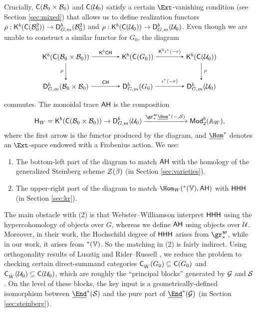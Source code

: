 \documentclass[a4paper,10pt,leqno]{amsart}
\theoremstyle{plain}
\theoremstyle{plain}
\theoremstyle{plain}
\theoremstyle{definition}
\theoremstyle{remark}
\let\Alt\relax
\DeclareMathOperator{\Alt}{\text{$\Lambda$}}
\newcommand{\Mod}{\mathsf{Mod}}
\begin{document}
Crucially, $\sf{C}(\cal{B}_0 \times \cal{B}_0)$ and $\sf{C}(\cal{U}_0)$ satisfy a certain $\Ext$-vanishing condition (see Section \ref{sec:mixed}) that allows us to define realization functors $\rho : \sf{K}^b(\sf{C}(\cal{B}_0^2)) \to \sf{D}_{G, m}^b(\cal{B}_0^2)$ and $\rho : \sf{K}^b(\sf{C}(\cal{U}_0)) \to \sf{D}_{G, m}^b(\cal{U}_0)$.
Even though we are unable to construct a similar functor for $G_0$, the diagram
\begin{equation}
\begin{tikzpicture}[baseline=(current bounding box.center), >=stealth]
\matrix(m)[matrix of math nodes, row sep=2.5em, column sep=4em, text height=2ex, text depth=0.5ex]
{	\sf{K}^b(\sf{C}(\cal{B}_0 \times \cal{B}_0))
		&\sf{K}^b(\sf{C}(G_0))
		&\sf{K}^b(\sf{C}(\cal{U}_0))\\
	\sf{D}_{G, m}^b(\cal{B}_0 \times \cal{B}_0)
		&\sf{D}_{G, m}^b(G_0)
		&\sf{D}_{G, m}^b(\cal{U}_0)\\
		};
\path[->,font=\scriptsize, auto]
(m-1-2) 	edge node{$\sf{K}^b i^\ast \langle -r\rangle$} (m-1-3)
(m-2-2)		edge node{$i^\ast \langle -r\rangle$} (m-2-3)
(m-1-1)		edge node{$\sf{K}^b \sf{CH}$} (m-1-2)
(m-2-1)		edge node{$\sf{CH}$} (m-2-2)
(m-1-3) 	edge node[right]{$\rho$} (m-2-3)	
(m-1-1)		edge node[left]{$\rho$} (m-2-1);
\end{tikzpicture}
\end{equation}
commutes.
The monoidal trace $\sf{AH}$ is the composition
\begin{align}
\sf{H}_W = \sf{K}^b(\sf{C}(\cal{B}_0 \times \cal{B}_0))
	\to \sf{D}_{G, m}^b(\cal{U}_0)
	\xrightarrow{\gr_\ast^{\bm{w}} \SHom^\ast(-, \cal{S})} \Mod_2^b(\bb{A}_W),
\end{align}
where the first arrow is the functor produced by the diagram, and $\SHom^\ast$ denotes an $\Ext$-space endowed with a Frobenius action.
We use:
\begin{enumerate}
\item 	The bottom-left part of the diagram to match $\sf{AH}$ with the homology of the generalized Steinberg scheme $\cal{Z}(\beta)$ (in Section \ref{sec:varieties}).
\item 	The upper-right part of the diagram to match $\Hom_W(\Alt^\ast(\bb{V}), \sf{AH})$ with $\sf{HHH}$ (in Section \ref{sec:kr}).
\end{enumerate}
The main obstacle with (2) is that Webster--Williamson interpret $\sf{HHH}$ using the hypercohomology of objects over $G$, whereas we define $\sf{AH}$ using objects over $\cal{U}$.
Moreover, in their work, the Hochschild degree of $\sf{HHH}$ arises from $\gr_\ast^{\bm{w}}$, while in our work, it arises from $\Alt^\ast(\bb{V})$.
So the matching in (2) is fairly indirect.
Using orthogonality results of Lusztig \cite{lusztig_1985_2} and Rider--Russell \cite{rr}, we reduce the problem to checking certain direct-summand categories $\sf{C}_{\hat{W}}(G_0) \subseteq \sf{C}(G_0)$ and $\sf{C}_{\hat{W}}(\cal{U}_0) \subseteq \sf{C}(\cal{U}_0)$, which are roughly the ``principal blocks'' generated by $\cal{G}$ and $\cal{S}$.
On the level of these blocks, the key input is a geometrically-defined isomorphism between $\SEnd^\ast(\cal{S})$ and the pure part of $\SEnd^\ast(\cal{G})$ (in Section \ref{sec:steinberg}).
\end{document}
